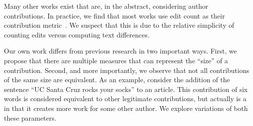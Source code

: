 Many other works exist that are, in the abstract, considering
author contributions.  In practice, we find that most works
use edit count as their contribution
metric~\cite{Wilkinson2007,Burke2008,Suh2008,Ortega2007,Stein2007,Ortega2009}.
We suspect that this is due to the relative simplicity of
counting edits versus computing text differences.

Our own work differs from previous research in two important ways.
First, we propose that there are multiple measures that
can represent the ``size'' of a contribution.
Second, and more importantly, we observe that not all
contributions of the same size are equivalent.
As an example, consider the addition of the sentence ``UC Santa
Cruz rocks your socks'' to an article.
This contribution of six words is considered equivalent to other
legitimate contributions, but actually is a 
in that it creates more work for some other author.
We explore variations of both these parameters.

